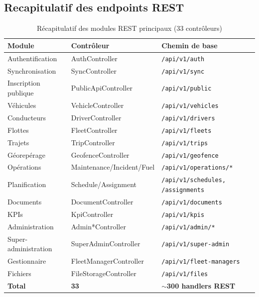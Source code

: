 \documentclass[12pt,a4paper]{report}
\begin{document}
\begin{enumerate}[leftmargin=2cm]
\section{Recapitulatif des endpoints REST}

\begin{table}[H]
\caption{Récapitulatif des modules REST principaux (33 contrôleurs)}
\label{tab:endpoints}
\centering\small
\begin{tabularx}{\textwidth}{p{4.5cm}p{2cm}X}
\toprule
\textbf{Module} & \textbf{Contrôleur} & \textbf{Chemin de base} \\
\midrule
Authentification      & AuthController & \texttt{/api/v1/auth} \\
Synchronisation       & SyncController & \texttt{/api/v1/sync} \\
Inscription publique  & PublicApiController & \texttt{/api/v1/public} \\
Véhicules             & VehicleController & \texttt{/api/v1/vehicles} \\
Conducteurs           & DriverController & \texttt{/api/v1/drivers} \\
Flottes               & FleetController & \texttt{/api/v1/fleets} \\
Trajets               & TripController & \texttt{/api/v1/trips} \\
Géorepérage           & GeofenceController & \texttt{/api/v1/geofence} \\
Opérations            & Maintenance/Incident/Fuel & \texttt{/api/v1/operations/*} \\
Planification         & Schedule/Assignment & \texttt{/api/v1/schedules, /assignments} \\
Documents             & DocumentController & \texttt{/api/v1/documents} \\
KPIs                  & KpiController & \texttt{/api/v1/kpis} \\
Administration        & Admin*Controller & \texttt{/api/v1/admin/*} \\
Super-administration  & SuperAdminController & \texttt{/api/v1/super-admin} \\
Gestionnaire          & FleetManagerController & \texttt{/api/v1/fleet-managers} \\
Fichiers              & FileStorageController & \texttt{/api/v1/files} \\
\midrule
\textbf{Total}        & \textbf{33} & \textbf{$\sim$300 handlers REST} \\
\bottomrule
\end{tabularx}
\end{table}


\end{enumerate}
\end{document}
